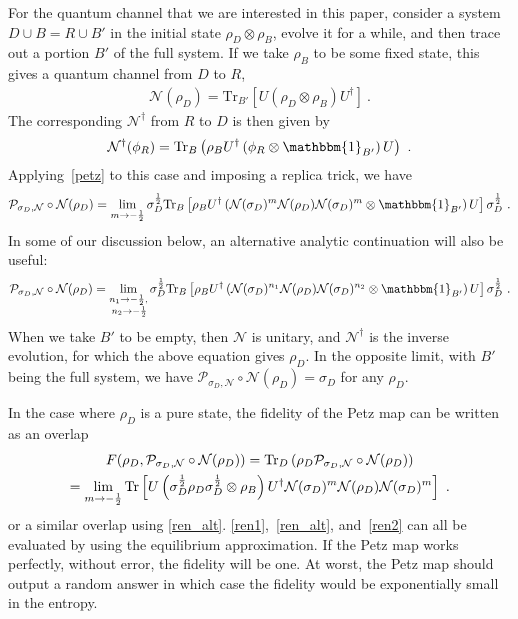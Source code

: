 \documentclass[a4paper,11pt]{article}
\newcommand\half{{\ensuremath{\frac{1}{2}}}}
\newcommand{\bega}{\begin{gather}}
\newcommand\sig{\sigma}
\newcommand\da{{\dagger}}
\newcommand\ha{{\half}}
\def\le{\left}
\def\ri{\right}
\newcommand\sN{{\ensuremath{{\mathcal N}}}}
\newcommand{\Tr}{\text{Tr}}
\begin{document}
For the quantum channel that we are interested in this paper, consider a system $D \cup B = R \cup B'$ in the initial state $\rho_D \otimes \rho_B$, evolve it for a while, and then trace out a portion $B'$ of the full system. If we take $\rho_B$ to be some fixed state, this gives a quantum channel from $D$ to $R$,
\begin{align}
 \mathcal{N}(\rho_D)= \Tr_{B'}\left[ U\left(\rho_D \otimes \rho_B \right)U^{\dagger} \right] \ . 
\end{align}
The corresponding $\sN^\da$ from $R$ to $D$ is then given by 
\begin{align}
 \mathcal{N}^{\dagger}(\phi_R) = \Tr_B \le(\rho_B U^{\dagger}\left(\phi_R \otimes \mathbbm{1}_{B'}\right)U \ri) \ .
\end{align}
Applying~\eqref{petz} to this case and imposing a replica trick, we have 
\bega \label{ren1}
 \mathcal{P}_{\sigma_D, \mathcal{N}}\circ \mathcal{N} (\rho_D)
 = \lim_{m \to -\ha} \sig_D^\ha \Tr_B \le[\rho_B U^{\dagger} \le(\sN (\sig_D)^m \mathcal{N}(\rho_D) \sN (\sig_D)^m \otimes \mathbbm{1}_{B'} \ri) U \ri] \sig_D^\ha \ .
 \end{gather} 
 In some of our discussion below, an alternative analytic continuation will also be useful: 
 \bega \label{ren_alt}
 \mathcal{P}_{\sigma_D, \mathcal{N}}\circ \mathcal{N} (\rho_D)
 = \lim_{\substack{n_1 \to -\ha, \\ \, n_2 \to -\ha}} \sig_D^\ha \Tr_B \le[\rho_B U^{\dagger} \le(\sN (\sig_D)^{n_1} \mathcal{N}(\rho_D) \sN (\sig_D)^{n_2} \otimes \mathbbm{1}_{B'} \ri) U \ri] \sig_D^\ha \ .
 \end{gather} 
When we take $B'$ to be empty, then $\sN$ is unitary, and $\sN^\da$ is the inverse evolution, for which the above equation gives $\rho_D$. In the opposite limit, with $B'$ being the full system, we have $\mathcal{P}_{\sigma_D, \mathcal{N}}\circ \mathcal{N} (\rho_D) = \sig_D$ for any $\rho_D$. 

In the case where $\rho_D$ is a pure state, the fidelity of the Petz map can be written as an overlap 
\bega \label{ren2}
 F(\rho_D, \mathcal{P}_{\sigma_D, \mathcal{N}}\circ \mathcal{N}(\rho_D)) = \Tr_D \le( \rho_D \mathcal{P}_{\sigma_D, \mathcal{N}}\circ \mathcal{N}(\rho_D)\ri) \cr
 = \lim_{m \to -\ha} \Tr \le[ U \le(\sig_D^\ha \rho_D \sig_D^\ha \otimes \rho_B \ri) U^\da \sN (\sig_D)^m \mathcal{N}(\rho_D) \sN (\sig_D)^m \ri] \ .
 \end{gather} 
 or a similar overlap using \eqref{ren_alt}. 
\eqref{ren1},~\eqref{ren_alt}, and~\eqref{ren2} can all be evaluated by using the equilibrium approximation. 
If the Petz map works perfectly, without error, the fidelity will be one. At worst, the Petz map should output a random answer in which case the fidelity would be exponentially small in the entropy. 
\end{document}
